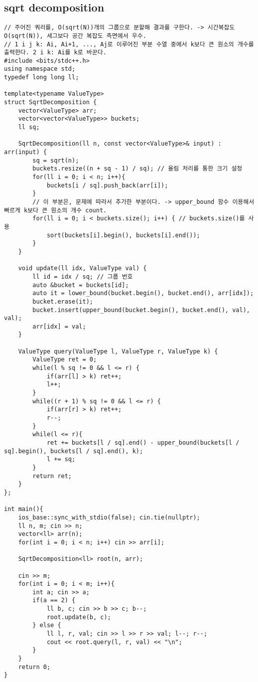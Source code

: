 \documentclass[landscape, 8pt, a4paper, oneside, twocolumn]{extarticle}
\begin{document}
    \subsection{sqrt decomposition}
    \begin{verbatim}
// 주어진 쿼리를, O(sqrt(N))개의 그룹으로 분할해 결과를 구한다. -> 시간복잡도  O(sqrt(N)), 세그보다 공간 복잡도 측면에서 우수.
// 1 i j k: Ai, Ai+1, ..., Aj로 이루어진 부분 수열 중에서 k보다 큰 원소의 개수를 출력한다. 2 i k: Ai를 k로 바꾼다.
#include <bits/stdc++.h>
using namespace std;
typedef long long ll;

template<typename ValueType>
struct SqrtDecomposition {
    vector<ValueType> arr;
    vector<vector<ValueType>> buckets;
    ll sq;

	SqrtDecomposition(ll n, const vector<ValueType>& input) : arr(input) {
        sq = sqrt(n);
        buckets.resize((n + sq - 1) / sq); // 올림 처리를 통한 크기 설정
        for(ll i = 0; i < n; i++){
            buckets[i / sq].push_back(arr[i]);
        }
		// 이 부분은, 문제에 따라서 추가한 부분이다. -> upper_bound 함수 이용해서 빠르게 k보다 큰 원소의 개수 count.
        for(ll i = 0; i < buckets.size(); i++) { // buckets.size()를 사용
            sort(buckets[i].begin(), buckets[i].end());
        }
    }

    void update(ll idx, ValueType val) {
        ll id = idx / sq; // 그룹 번호
        auto &bucket = buckets[id];
        auto it = lower_bound(bucket.begin(), bucket.end(), arr[idx]);
        bucket.erase(it);
        bucket.insert(upper_bound(bucket.begin(), bucket.end(), val), val);
        arr[idx] = val;
    }

    ValueType query(ValueType l, ValueType r, ValueType k) {
        ValueType ret = 0;
        while(l % sq != 0 && l <= r) {
            if(arr[l] > k) ret++;
            l++;
        }
        while((r + 1) % sq != 0 && l <= r) {
            if(arr[r] > k) ret++;
            r--;
        }
        while(l <= r){
            ret += buckets[l / sq].end() - upper_bound(buckets[l / sq].begin(), buckets[l / sq].end(), k);
            l += sq;
        }
        return ret;
    }
};

int main(){
    ios_base::sync_with_stdio(false); cin.tie(nullptr);
    ll n, m; cin >> n;
    vector<ll> arr(n);
    for(int i = 0; i < n; i++) cin >> arr[i];

    SqrtDecomposition<ll> root(n, arr);

    cin >> m;
    for(int i = 0; i < m; i++){
        int a; cin >> a;
        if(a == 2) {
            ll b, c; cin >> b >> c; b--;
            root.update(b, c);
        } else {
            ll l, r, val; cin >> l >> r >> val; l--; r--;
            cout << root.query(l, r, val) << "\n";
        }
    }
    return 0;
}
    \end{verbatim}
\end{document}
